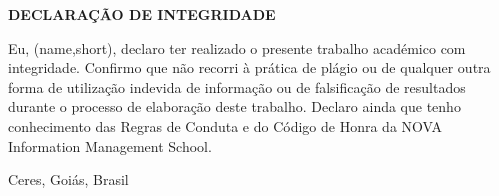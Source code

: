 
%

\begingroup
\setlength{\parskip}{1ex plus 1pt minus 1pt}
\setlength{\parindent}{0cm}
\begin{center}
  \textbf{DECLARAÇÃO DE INTEGRIDADE}
\end{center}

Eu, \thedocauthor(name,short), declaro ter realizado o presente trabalho académico com integridade.
Confirmo que não recorri à prática de plágio ou de qualquer outra forma de utilização indevida de informação ou de falsificação de resultados durante o processo de elaboração deste trabalho.
Declaro ainda que tenho conhecimento das Regras de Conduta e do Código de Honra da NOVA Information Management School.

\bigskip

Ceres, Goiás, Brasil \\
%
%
\endgroup
\clearforchapter
